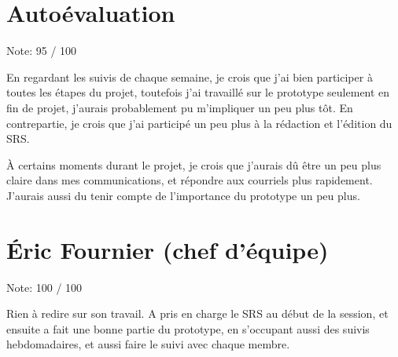 \documentclass[11pt]{article} %
\begin{document}

\tableofcontents %

\newpage %

 
\section{Autoévaluation} %

{\LARGE Note: 95 / 100}

En regardant les suivis de chaque semaine, je crois que j'ai bien participer à toutes les étapes du projet, toutefois j'ai travaillé
sur le prototype seulement en fin de projet, j'aurais probablement pu m'impliquer un peu plus tôt. En contrepartie, je crois que j'ai
participé un peu plus à la rédaction et l'édition du SRS. 

À certains moments durant le projet, je crois que j'aurais dû être un peu plus claire dans mes communications, et répondre aux courriels
plus rapidement. J'aurais aussi du tenir compte de l'importance du prototype un peu plus.


 
\section{Éric Fournier (chef d'équipe)}

{\LARGE Note: 100 / 100}
 
Rien à redire sur son travail. A pris en charge le SRS au début de la session, et ensuite a
fait une bonne partie du prototype, en s'occupant aussi des suivis hebdomadaires, et aussi
faire le suivi avec chaque membre.
 
 
\end{document}
